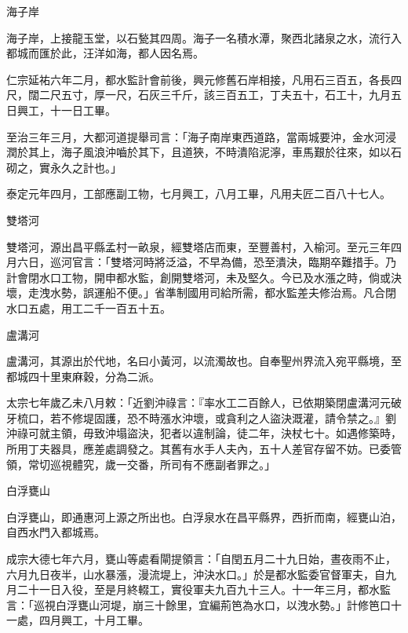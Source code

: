 \begin{pinyinscope}
 海子岸



 海子岸，上接龍玉堂，以石甃其四周。海子一名積水潭，聚西北諸泉之水，流行入都城而匯於此，汪洋如海，都人因名焉。



 仁宗延祐六年二月，都水監計會前後，興元修舊石岸相接，凡用石三百五，各長四尺，闊二尺五寸，厚一尺，石灰三千斤，該三百五工，丁夫五十，石工十，九月五日興工，十一日工畢。



 至治三年三月，大都河道提舉司言：「海子南岸東西道路，當兩城要沖，金水河浸潤於其上，海子風浪沖嚙於其下，且道狹，不時潰陷泥濘，車馬艱於往來，如以石砌之，實永久之計也。」



 泰定元年四月，工部應副工物，七月興工，八月工畢，凡用夫匠二百八十七人。



 雙塔河



 雙塔河，源出昌平縣孟村一畝泉，經雙塔店而東，至豐善村，入榆河。至元三年四月六日，巡河官言：「雙塔河時將泛溢，不早為備，恐至潰決，臨期卒難措手。乃計會閉水口工物，開申都水監，創開雙塔河，未及堅久。今已及水漲之時，倘或決壞，走洩水勢，誤運船不便。」省準制國用司給所需，都水監差夫修治焉。凡合閉水口五處，用工二千一百五十五。



 盧溝河



 盧溝河，其源出於代地，名曰小黃河，以流濁故也。自奉聖州界流入宛平縣境，至都城四十里東麻穀，分為二派。



 太宗七年歲乙未八月敕：「近劉沖祿言：『率水工二百餘人，已依期築閉盧溝河元破牙梳口，若不修堤固護，恐不時漲水沖壞，或貪利之人盜決溉灌，請令禁之。』劉沖祿可就主領，毋致沖塌盜決，犯者以違制論，徒二年，決杖七十。如遇修築時，所用丁夫器具，應差處調發之。其舊有水手人夫內，五十人差官存留不妨。已委管領，常切巡視體究，歲一交番，所司有不應副者罪之。」



 白浮甕山



 白浮甕山，即通惠河上源之所出也。白浮泉水在昌平縣界，西折而南，經甕山泊，自西水門入都城焉。



 成宗大德七年六月，甕山等處看閘提領言：「自閏五月二十九日始，晝夜雨不止，六月九日夜半，山水暴漲，漫流堤上，沖決水口。」於是都水監委官督軍夫，自九月二十一日入役，至是月終輟工，實役軍夫九百九十三人。十一年三月，都水監言：「巡視白浮甕山河堤，崩三十餘里，宜編荊笆為水口，以洩水勢。」計修笆口十一處，四月興工，十月工畢。




\end{pinyinscope}

